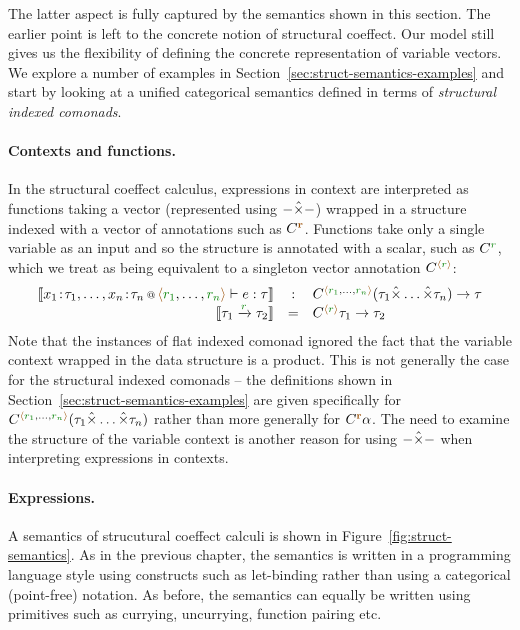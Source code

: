The latter aspect is fully captured by the semantics shown in this section. The
earlier point is left to the concrete notion of structural coeffect. Our model still gives
us the flexibility of defining the concrete representation of variable vectors. We explore
a number of examples in Section~\ref{sec:struct-semantics-examples} and start by looking
at a unified categorical semantics defined in terms of \emph{structural indexed comonads}.

\paragraph{Contexts and functions.}
In the structural coeffect calculus, expressions in context are interpreted as functions taking
a vector (represented using $-\hat{\times}-$) wrapped in a structure indexed with a vector of annotations
such as $\ctyp{\aclrd{\textbf{r}}}$. Functions take only a single variable as an input and so the
structure is annotated with a scalar, such as $\ctyp{\cclrd{r}}$, which we treat as being equivalent
to a singleton vector annotation $\ctyp{\alift{\cclrd{r}}}$:
%
\begin{equation*}
\begin{array}{rcl}
\sem{\coctx{x_1\!:\!\tau_1, \ldots, x_n\!:\!\tau_n}{ \alift{\cclrd{r_1}, \ldots, \cclrd{r_n}} } \vdash e : \tau} 
  &:& \ctyp{ \alift{\cclrd{r_1}, \ldots, \cclrd{r_n}} }{(\tau_1 \xtimes \ldots \xtimes \tau_n)} \rightarrow \tau\\
\sem{\tau_1 \xrightarrow{\cclrd{r}} \tau_2} &=& \ctyp{\alift{\cclrd{r}}}{\tau_1} \rightarrow \tau_2
\end{array}
\end{equation*}
%
Note that the instances of flat indexed comonad ignored the fact that the variable 
context wrapped in the data structure is a product. This is not generally the case for the 
structural indexed comonads -- the definitions shown in Section~\ref{sec:struct-semantics-examples}
are given specifically for $\ctyp{ \alift{\cclrd{r_1}, \ldots, \cclrd{r_n}} }{(\tau_1 \xtimes \ldots \xtimes \tau_n)}$
rather than more generally for $\ctyp{\aclrd{\textbf{r}}}{\alpha}$. The need to examine the structure
of the variable context is another reason for using $-\hat{\times}-$ when interpreting expressions in contexts.

\paragraph{Expressions.}
A semantics of strucutural coeffect calculi is shown in Figure~\ref{fig:struct-semantics}. As in
the previous chapter, the semantics is written in a programming language style using constructs
such as let-binding rather than using a categorical (point-free) notation. As before, the semantics
can equally be written using primitives such as currying, uncurrying, function pairing etc.

